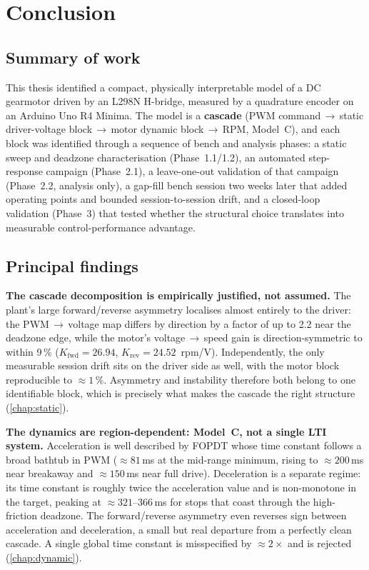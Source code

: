 \chapter{Conclusion}
\label{chap:conclusion}

\section{Summary of work}
\label{sec:concl-summary}

This thesis identified a compact, physically interpretable model of a DC gearmotor driven by an L298N H-bridge, measured by a quadrature encoder on an Arduino Uno R4 Minima. The model is a \textbf{cascade} (PWM command\,$\to$\,static driver-voltage block\,$\to$\,motor dynamic block\,$\to$\,RPM, Model~C), and each block was identified through a sequence of bench and analysis phases: a static sweep and deadzone characterisation (Phase~1.1/1.2), an automated step-response campaign (Phase~2.1), a leave-one-out validation of that campaign (Phase~2.2, analysis only), a gap-fill bench session two weeks later that added operating points and bounded session-to-session drift, and a closed-loop validation (Phase~3) that tested whether the structural choice translates into measurable control-performance advantage.

\section{Principal findings}
\label{sec:concl-findings}

\textbf{The cascade decomposition is empirically justified, not assumed.} The plant's large forward/reverse asymmetry localises almost entirely to the driver: the PWM\,$\to$\,voltage map differs by direction by a factor of up to 2.2 near the deadzone edge, while the motor's voltage\,$\to$\,speed gain is direction-symmetric to within 9\,\% ($K_{\mathrm{fwd}} = 26.94$, $K_{\mathrm{rev}} = 24.52$~rpm/V). Independently, the only measurable session drift sits on the driver side as well, with the motor block reproducible to ${\approx}1\,\%$. Asymmetry and instability therefore both belong to one identifiable block, which is precisely what makes the cascade the right structure (\cref{chap:static}).

\textbf{The dynamics are region-dependent: Model~C, not a single LTI system.} Acceleration is well described by FOPDT whose time constant follows a broad bathtub in PWM (${\approx}81$\,ms at the mid-range minimum, rising to ${\approx}200$\,ms near breakaway and ${\approx}150$\,ms near full drive). Deceleration is a separate regime: its time constant is roughly twice the acceleration value and is non-monotone in the target, peaking at ${\approx}321$--$366$\,ms for stops that coast through the high-friction deadzone. The forward/reverse asymmetry even reverses sign between acceleration and deceleration, a small but real departure from a perfectly clean cascade. A single global time constant is misspecified by ${\approx}2\times$ and is rejected (\cref{chap:dynamic}).

